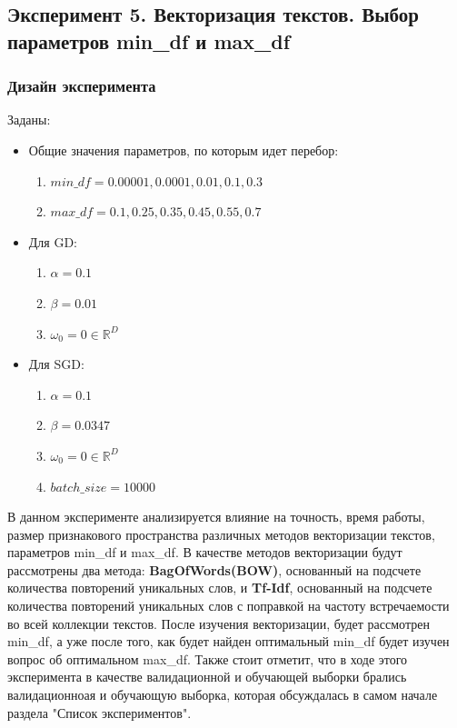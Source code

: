 \subsection{Эксперимент 5. Векторизация текстов. Выбор параметров min\_df и max\_df}
\subsubsection{Дизайн эксперимента}
Заданы: \\
\begin{itemize}
	\item Общие значения параметров, по которым идет перебор:
	\begin{enumerate}
		\item $min\_df = 0.00001, 0.0001, 0.01, 0.1, 0.3$
		\item  $max\_df = 0.1, 0.25, 0.35, 0.45, 0.55, 0.7$
	\end{enumerate}
	\item Для GD:
	\begin{enumerate}
		\item $\alpha = 0.1$
		\item  $\beta = 0.01$
		\item  $\omega_0 = 0 \in \mathbb{R}^D$
	\end{enumerate}
	\item Для SGD:
	\begin{enumerate}
		\item $\alpha = 0.1$
		\item  $\beta = 0.0347$
		\item  $\omega_0 = 0 \in \mathbb{R}^D$
		\item  $batch\_size = 10000 $
	\end{enumerate}
\end{itemize}

В данном эксперименте анализируется влияние на точность, время работы, размер признакового пространства различных методов векторизации текстов, параметров min\_df и  max\_df. В качестве методов векторизации будут рассмотрены два метода:
{\bf BagOfWords(BOW)}, основанный на подсчете количества повторений уникальных слов, и {\bf Tf-Idf}, основанный на подсчете количества повторений уникальных слов с поправкой на частоту встречаемости во всей коллекции текстов. После изучения векторизации, будет рассмотрен min\_df, а уже после того, как будет найден оптимальный min\_df будет изучен вопрос об оптимальном max\_df. Также стоит отметит, что в ходе этого эксперимента в качестве валидационной и обучающей выборки брались валидационноая и обучающую выборка, которая обсуждалась в самом начале раздела "Список экспериментов".
